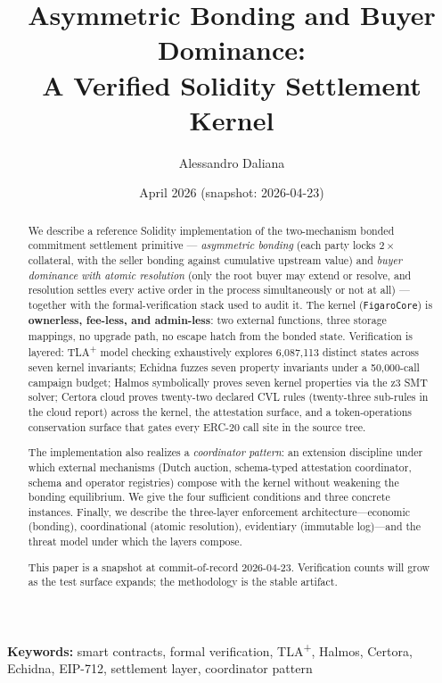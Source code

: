 \documentclass[11pt,a4paper]{article}
\title{%
  Asymmetric Bonding and Buyer Dominance:\\
  A Verified Solidity Settlement Kernel%
}
\author{
  Alessandro Daliana
}
\date{April 2026 (snapshot: 2026-04-23)}
\theoremstyle{definition}
\theoremstyle{remark}
\begin{document}
\maketitle

\begin{abstract}
We describe a reference Solidity implementation of the two-mechanism
bonded commitment settlement primitive --- \emph{asymmetric bonding}
(each party locks $2\times$ collateral, with the seller bonding
against cumulative upstream value) and \emph{buyer dominance with
atomic resolution} (only the root buyer may extend or resolve, and
resolution settles every active order in the process simultaneously
or not at all) --- together with the formal-verification stack used
to audit it. The kernel (\texttt{FigaroCore}) is \textbf{ownerless,
fee-less, and admin-less}: two external functions, three storage
mappings, no upgrade path, no escape hatch from the bonded state.
Verification is layered: TLA\textsuperscript{+} model checking
exhaustively explores 6{,}087{,}113 distinct states across seven
kernel invariants; Echidna fuzzes seven property invariants under a
50{,}000-call campaign budget; Halmos symbolically proves seven
kernel properties via the z3 SMT solver; Certora cloud proves
twenty-two declared CVL rules (twenty-three sub-rules in the cloud
report) across the kernel, the attestation surface, and a
token-operations conservation surface that gates every ERC-20 call
site in the source tree.

The implementation also realizes a \emph{coordinator pattern}: an
extension discipline under which external mechanisms (Dutch auction,
schema-typed attestation coordinator, schema and operator registries)
compose with the kernel without weakening the bonding equilibrium.
We give the four sufficient conditions and three concrete instances.
Finally, we describe the three-layer enforcement architecture---economic
(bonding), coordinational (atomic resolution), evidentiary (immutable
log)---and the threat model under which the layers compose.

This paper is a snapshot at commit-of-record 2026-04-23. Verification
counts will grow as the test surface expands; the methodology is the
stable artifact.
\end{abstract}

\medskip
\noindent\textbf{Keywords:}
smart contracts, formal verification, TLA\textsuperscript{+}, Halmos,
Certora, Echidna, EIP-712, settlement layer, coordinator pattern
\end{document}
